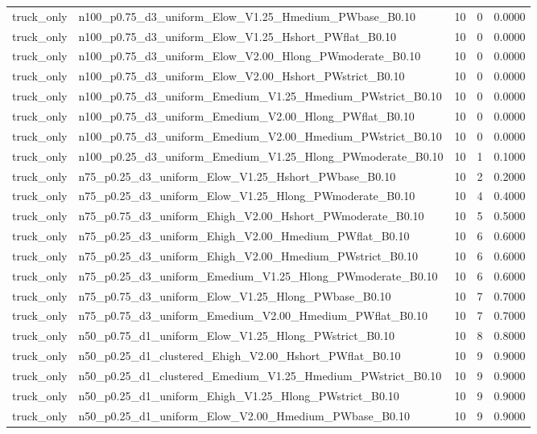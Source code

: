 \begin{tabular}{llrrr}
truck_only & n100_p0.75_d3_uniform_Elow_V1.25_Hmedium_PWbase_B0.10 & 10 & 0 & 0.0000 \\
truck_only & n100_p0.75_d3_uniform_Elow_V1.25_Hshort_PWflat_B0.10 & 10 & 0 & 0.0000 \\
truck_only & n100_p0.75_d3_uniform_Elow_V2.00_Hlong_PWmoderate_B0.10 & 10 & 0 & 0.0000 \\
truck_only & n100_p0.75_d3_uniform_Elow_V2.00_Hshort_PWstrict_B0.10 & 10 & 0 & 0.0000 \\
truck_only & n100_p0.75_d3_uniform_Emedium_V1.25_Hmedium_PWstrict_B0.10 & 10 & 0 & 0.0000 \\
truck_only & n100_p0.75_d3_uniform_Emedium_V2.00_Hlong_PWflat_B0.10 & 10 & 0 & 0.0000 \\
truck_only & n100_p0.75_d3_uniform_Emedium_V2.00_Hmedium_PWstrict_B0.10 & 10 & 0 & 0.0000 \\
truck_only & n100_p0.25_d3_uniform_Emedium_V1.25_Hlong_PWmoderate_B0.10 & 10 & 1 & 0.1000 \\
truck_only & n75_p0.25_d3_uniform_Elow_V1.25_Hshort_PWbase_B0.10 & 10 & 2 & 0.2000 \\
truck_only & n75_p0.25_d3_uniform_Elow_V1.25_Hlong_PWmoderate_B0.10 & 10 & 4 & 0.4000 \\
truck_only & n75_p0.75_d3_uniform_Ehigh_V2.00_Hshort_PWmoderate_B0.10 & 10 & 5 & 0.5000 \\
truck_only & n75_p0.25_d3_uniform_Ehigh_V2.00_Hmedium_PWflat_B0.10 & 10 & 6 & 0.6000 \\
truck_only & n75_p0.25_d3_uniform_Ehigh_V2.00_Hmedium_PWstrict_B0.10 & 10 & 6 & 0.6000 \\
truck_only & n75_p0.25_d3_uniform_Emedium_V1.25_Hlong_PWmoderate_B0.10 & 10 & 6 & 0.6000 \\
truck_only & n75_p0.75_d3_uniform_Elow_V1.25_Hlong_PWbase_B0.10 & 10 & 7 & 0.7000 \\
truck_only & n75_p0.75_d3_uniform_Emedium_V2.00_Hmedium_PWflat_B0.10 & 10 & 7 & 0.7000 \\
truck_only & n50_p0.75_d1_uniform_Elow_V1.25_Hlong_PWstrict_B0.10 & 10 & 8 & 0.8000 \\
truck_only & n50_p0.25_d1_clustered_Ehigh_V2.00_Hshort_PWflat_B0.10 & 10 & 9 & 0.9000 \\
truck_only & n50_p0.25_d1_clustered_Emedium_V1.25_Hmedium_PWstrict_B0.10 & 10 & 9 & 0.9000 \\
truck_only & n50_p0.25_d1_uniform_Ehigh_V1.25_Hlong_PWstrict_B0.10 & 10 & 9 & 0.9000 \\
truck_only & n50_p0.25_d1_uniform_Elow_V2.00_Hmedium_PWbase_B0.10 & 10 & 9 & 0.9000 \\

\end{tabular}
